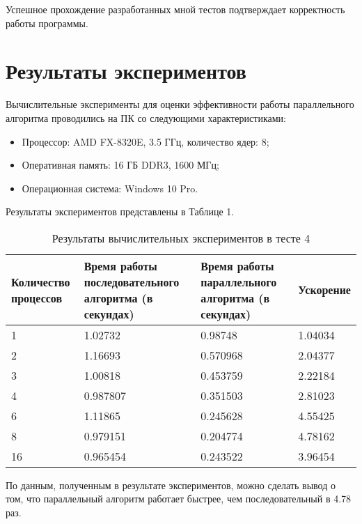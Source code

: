 \documentclass{report}
\begin{document}
\par Успешное прохождение разработанных мной тестов подтверждает корректность работы программы.
\newpage

\section*{Результаты экспериментов}
Вычислительные эксперименты для оценки эффективности работы параллельного алгоритма проводились на ПК со следующими характеристиками:
\begin{itemize}
\item Процессор: AMD FX-8320E, 3.5 ГГц, количество ядер: 8;
\item Оперативная память: 16 ГБ DDR3, 1600  МГц;
\item Операционная система: Windows 10 Pro.
\end{itemize}

\par Результаты экспериментов представлены в Таблице 1.

\begin{table}[!h]
\caption{Результаты вычислительных экспериментов в тесте 4}
\centering
\begin{tabular}{| p{2cm} | p{3cm} | p{4cm} | p{2cm} |}
\hline
Количество процессов & Время работы последовательного алгоритма (в секундах) & Время работы параллельного алгоритма (в секундах) & Ускорение  \\[5pt]
\hline
1        & 1.02732        & 0.98748     & 1.04034       \\
2        & 1.16693        & 0.570968     & 2.04377       \\
3        & 1.00818        & 0.453759     & 2.22184       \\
4        & 0.987807        & 0.351503     & 2.81023       \\
6        & 1.11865        & 0.245628     & 4.55425       \\
8        & 0.979151        & 0.204774     & 4.78162	  \\
16        & 0.965454        & 0.243522     & 3.96454	  \\
\hline
\end{tabular}
\end{table}
По данным, полученным в результате экспериментов, можно сделать вывод о том,
что параллельный алгоритм работает быстрее, чем последовательный в 4.78 раз.

\newpage
\end{document}

